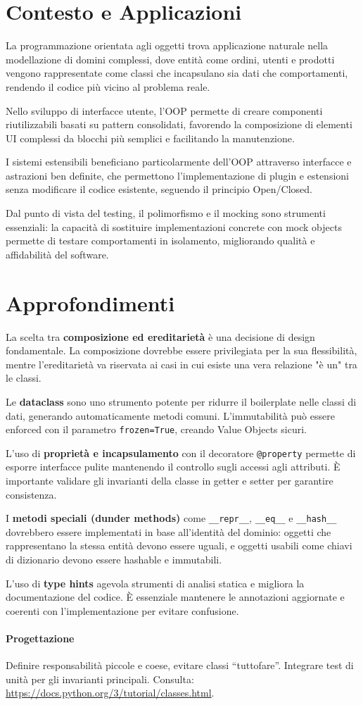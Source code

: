 \section{Contesto e Applicazioni}
\begin{tcolorbox}[title=Contesto e Applicazioni]
La programmazione orientata agli oggetti trova applicazione naturale nella modellazione di domini complessi, dove entità come ordini, utenti e prodotti vengono rappresentate come classi che incapsulano sia dati che comportamenti, rendendo il codice più vicino al problema reale.

Nello sviluppo di interfacce utente, l'OOP permette di creare componenti riutilizzabili basati su pattern consolidati, favorendo la composizione di elementi UI complessi da blocchi più semplici e facilitando la manutenzione.

I sistemi estensibili beneficiano particolarmente dell'OOP attraverso interfacce e astrazioni ben definite, che permettono l'implementazione di plugin e estensioni senza modificare il codice esistente, seguendo il principio Open/Closed.

Dal punto di vista del testing, il polimorfismo e il mocking sono strumenti essenziali: la capacità di sostituire implementazioni concrete con mock objects permette di testare comportamenti in isolamento, migliorando qualità e affidabilità del software.
\end{tcolorbox}

\section{Approfondimenti}
\begin{tcolorbox}[title=Spiegazioni dettagliate]
La scelta tra \textbf{composizione ed ereditarietà} è una decisione di design fondamentale. La composizione dovrebbe essere privilegiata per la sua flessibilità, mentre l'ereditarietà va riservata ai casi in cui esiste una vera relazione "è un" tra le classi.

Le \textbf{dataclass} sono uno strumento potente per ridurre il boilerplate nelle classi di dati, generando automaticamente metodi comuni. L'immutabilità può essere enforced con il parametro \verb|frozen=True|, creando Value Objects sicuri.

L'uso di \textbf{proprietà e incapsulamento} con il decoratore \verb|@property| permette di esporre interfacce pulite mantenendo il controllo sugli accessi agli attributi. È importante validare gli invarianti della classe in getter e setter per garantire consistenza.

I \textbf{metodi speciali (dunder methods)} come \verb|__repr__|, \verb|__eq__| e \verb|__hash__| dovrebbero essere implementati in base all'identità del dominio: oggetti che rappresentano la stessa entità devono essere uguali, e oggetti usabili come chiavi di dizionario devono essere hashable e immutabili.

L'uso di \textbf{type hints} agevola strumenti di analisi statica e migliora la documentazione del codice. È essenziale mantenere le annotazioni aggiornate e coerenti con l'implementazione per evitare confusione.
\end{tcolorbox}

\paragraph{Progettazione} Definire responsabilità piccole e coese, evitare classi “tuttofare”. Integrare test di unità per gli invarianti principali.
Consulta: \url{https://docs.python.org/3/tutorial/classes.html}.
